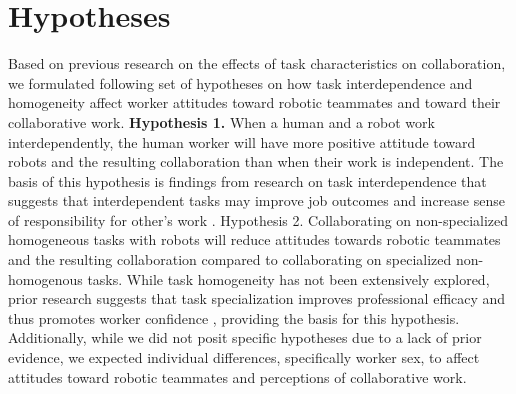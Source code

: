 \section{Hypotheses}
       Based on previous research on the effects of task characteristics on collaboration, we formulated following set of hypotheses on how task interdependence and homogeneity affect worker attitudes toward robotic teammates and toward their collaborative work. 
       \textbf{Hypothesis 1.} When a human and a robot work interdependently, the human worker will have more positive attitude toward robots and the resulting collaboration than when their work is independent. 
       The basis of this hypothesis is findings from research on task interdependence that suggests 
that interdependent tasks may improve job outcomes and increase sense of responsibility for other’s work \cite{van1998motivating, johnson2012autonomy}.
       Hypothesis 2. Collaborating on non-specialized homogeneous tasks with robots will reduce attitudes towards robotic teammates and the resulting collaboration compared to collaborating on specialized non-homogenous tasks.
       While task homogeneity has not been extensively explored, prior research suggests that task specialization improves professional efficacy and thus promotes worker confidence \cite{hsieh2004reassessment}, providing the basis for this hypothesis.
       Additionally, while we did not posit specific hypotheses due to a lack of prior evidence, we expected individual differences, specifically worker sex, to affect attitudes toward robotic teammates and perceptions of collaborative work.
